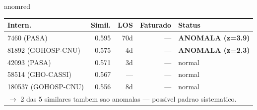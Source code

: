 \documentclass[a4paper,10pt]{article}
\begin{document}
\begin{anomalycard}[Internacao 145780 | GHO-PETROBRAS | CRITICO (z=6.04)]{anomred}
\begin{tabular}{l r r r l}\toprule\textbf{Intern.} & \textbf{Simil.} & \textbf{LOS} & \textbf{Faturado} & \textbf{Status} \\\midrule
7460 (PASA) & 0.595 & 70d & --- & \textcolor{anomred}{\textbf{ANOMALA (z=3.9)}} \\
81892 (GOHOSP-CNU) & 0.575 & 4d & --- & \textcolor{anomred}{\textbf{ANOMALA (z=2.3)}} \\
42093 (PASA) & 0.571 & 3d & --- & \textcolor{jcubeblue}{normal} \\
58514 (GHO-CASSI) & 0.567 & --- & --- & \textcolor{jcubeblue}{normal} \\
180537 (GOHOSP-CNU) & 0.556 & 8d & --- & \textcolor{jcubeblue}{normal} \\
\multicolumn{5}{l}{\textcolor{anomred}{\small $\rightarrow$ 2 das 5 similares tambem sao anomalas --- possivel padrao sistematico.}} \\
\bottomrule\end{tabular}



\end{anomalycard}

\newpage
\end{document}
